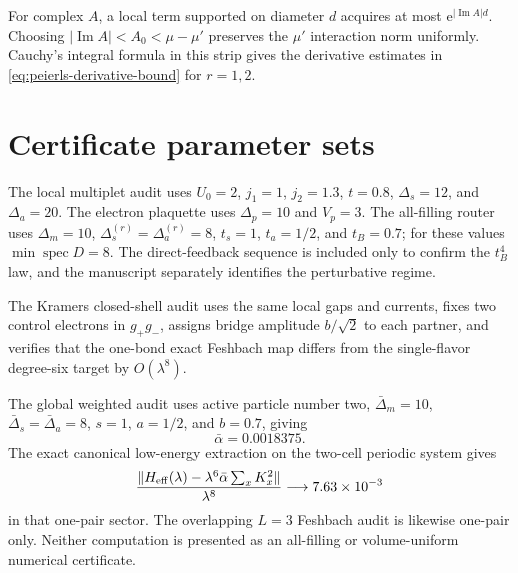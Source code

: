 \documentclass[11pt]{article}
\theoremstyle{definition}
\theoremstyle{remark}
\newcommand{\spec}{\operatorname{spec}}
\newcommand{\e}{\mathrm e}
\newcommand{\abs}[1]{\lvert #1\rvert}
\newcommand{\norm}[1]{\lVert #1\rVert}
\begin{document}
For complex $A$, a local term supported on diameter $d$ acquires at most $\e^{\abs{\operatorname{Im}A}d}$.  Choosing $\abs{\operatorname{Im}A}<A_0<\mu-\mu'$ preserves the $\mu'$ interaction norm uniformly.  Cauchy's integral formula in this strip gives the derivative estimates in \eqref{eq:peierls-derivative-bound} for $r=1,2$.

\section{Certificate parameter sets}
\label{app:certificates}

The local multiplet audit uses $U_0=2$, $j_1=1$, $j_2=1.3$, $t=0.8$, $\Delta_s=12$, and $\Delta_a=20$.  The electron plaquette uses $\Delta_p=10$ and $V_p=3$.  The all-filling router uses $\Delta_m=10$, $\Delta_s^{(r)}=\Delta_a^{(r)}=8$, $t_s=1$, $t_a=1/2$, and $t_B=0.7$; for these values $\min\spec D=8$.  The direct-feedback sequence is included only to confirm the $t_B^4$ law, and the manuscript separately identifies the perturbative regime.

The Kramers closed-shell audit uses the same local gaps and currents, fixes two control electrons in $g_+g_-$, assigns bridge amplitude $b/\sqrt2$ to each partner, and verifies that the one-bond exact Feshbach map differs from the single-flavor degree-six target by $O(\lambda^8)$.

The global weighted audit uses active particle number two, $\bar\Delta_m=10$, $\bar\Delta_s=\bar\Delta_a=8$, $s=1$, $a=1/2$, and $b=0.7$, giving
\begin{equation}
 \bar\alpha=0.0018375.
\end{equation}
The exact canonical low-energy extraction on the two-cell periodic system gives
\begin{equation}
 \frac{\norm{H_{\rm eff}(\lambda)-\lambda^6\bar\alpha\sum_xK_x^2}}{\lambda^8}
 \longrightarrow 7.63\times10^{-3}
\end{equation}
in that one-pair sector.  The overlapping $L=3$ Feshbach audit is likewise one-pair only.  Neither computation is presented as an all-filling or volume-uniform numerical certificate.
\end{document}
